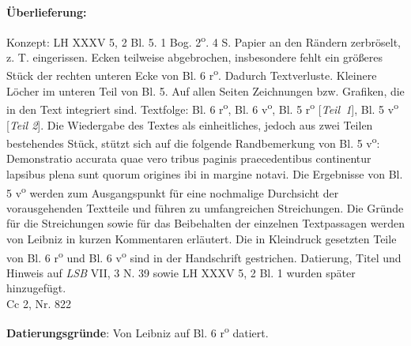       
               
                \begin{ledgroupsized}[r]{120mm}
                \footnotesize 
                \pstart                
                \noindent\textbf{\"{U}berlieferung:}   
                \pend
                \end{ledgroupsized}
            
              
                            \begin{ledgroupsized}[r]{114mm}
                            \footnotesize 
                            \pstart \parindent -6mm
                            Konzept: LH XXXV 5, 2 Bl. 5. 1 Bog. 2\textsuperscript{o}. 4 S. Papier an den R\"{a}ndern zerbr\"{o}selt, z. T. eingerissen. Ecken teilweise abgebrochen, insbesondere fehlt ein gr\"{o}ßeres St\"{u}ck der rechten unteren Ecke von Bl. 6 r\textsuperscript{o}. Dadurch Textverluste. Kleinere L\"{o}cher im unteren Teil von Bl. 5. Auf allen Seiten Zeichnungen bzw. Grafiken, die in den Text integriert sind. Textfolge: Bl. 6 r\textsuperscript{o}, Bl. 6 v\textsuperscript{o}, Bl. 5 r\textsuperscript{o} [\textit{Teil~1}], Bl. 5 v\textsuperscript{o} [\textit{Teil 2}]. Die Wiedergabe des Textes als einheitliches, jedoch aus zwei Teilen bestehendes St\"{u}ck, st\"{u}tzt sich auf die folgende Randbemerkung von Bl. 5 v\textsuperscript{o}: Demonstratio accurata quae vero tribus paginis praecedentibus continentur lapsibus plena sunt quorum origines ibi in margine notavi. Die Ergebnisse von Bl. 5 v\textsuperscript{o} werden zum Ausgangspunkt f\"{u}r eine nochmalige Durchsicht der vor\-ausgehenden Textteile und f\"{u}hren zu umfangreichen Streichungen. Die Gr\"{u}nde f\"{u}r die Streichungen sowie f\"{u}r das Beibehalten der einzelnen Textpassagen werden von Leibniz in kurzen Kommentaren erl\"{a}utert. Die in Kleindruck gesetzten Teile von Bl. 6 r\textsuperscript{o} und Bl. 6 v\textsuperscript{o} sind in der Handschrift gestrichen. Datierung, Titel und Hinweis auf \cite{00261}\textit{LSB} VII, 3 N. 39 sowie LH XXXV 5, 2 Bl. 1 wurden sp\"{a}ter hinzugef\"{u}gt. \\Cc 2, Nr. 822 
                            \pend
                             \end{ledgroupsized}
                     
                \vspace*{5mm}
                \begin{ledgroup}
                \footnotesize 
                \pstart
            \noindent\footnotesize{\textbf{Datierungsgr\"{u}nde}: Von Leibniz auf Bl. 6 r\textsuperscript{o} datiert.}
                \pend
                \end{ledgroup}
            
